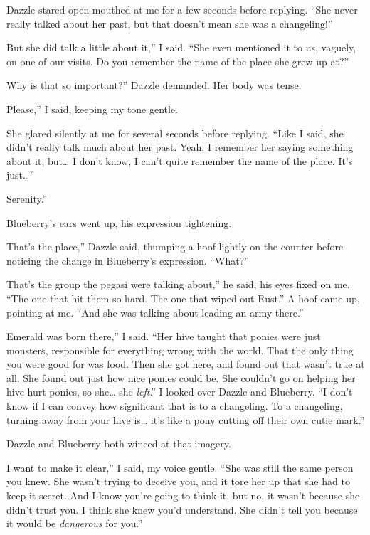 Dazzle stared open-mouthed at me for a few seconds before replying. “She never really talked about her past, but that doesn’t mean she was a changeling!”

\leavevmode{}But she did talk a little about it,” I said. “She even mentioned it to us, vaguely, on one of our visits. Do you remember the name of the place she grew up at?”

\leavevmode{}Why is that so important?” Dazzle demanded. Her body was tense.

\leavevmode{}Please,” I said, keeping my tone gentle.

She glared silently at me for several seconds before replying. “Like I said, she didn’t really talk much about her past. Yeah, I remember her saying something about it, but… I don’t know, I can’t quite remember the name of the place. It’s just…”

\leavevmode{}Serenity.”

Blueberry’s ears went up, his expression tightening.

\leavevmode{}That’s the place,” Dazzle said, thumping a hoof lightly on the counter before noticing the change in Blueberry’s expression. “What?”

\leavevmode{}That’s the group the pegasi were talking about,” he said, his eyes fixed on me. “The one that hit them so hard. The one that wiped out Rust.” A hoof came up, pointing at me. “And she was talking about leading an army there.”

\leavevmode{}Emerald was born there,” I said. “Her hive taught that ponies were just monsters, responsible for everything wrong with the world. That the only thing you were good for was food. Then she got here, and found out that wasn’t true at all. She found out just how nice ponies could be. She couldn’t go on helping her hive hurt ponies, so she… she \textit{left}.” I looked over Dazzle and Blueberry. “I don’t know if I can convey how significant that is to a changeling. To a changeling, turning away from your hive is… it’s like a pony cutting off their own cutie mark.”

Dazzle and Blueberry both winced at that imagery.

\leavevmode{}I want to make it clear,” I said, my voice gentle. “She was still the same person you knew. She wasn’t trying to deceive you, and it tore her up that she had to keep it secret. And I know you’re going to think it, but no, it wasn’t because she didn’t trust you. I think she knew you’d understand. She didn’t tell you because it would be \textit{dangerous} for you.”

